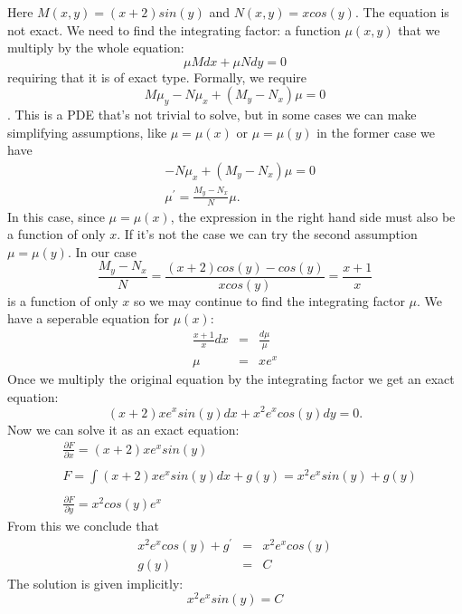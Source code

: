 \documentclass[11pt]{article}
\begin{document}
\begin{solution}
  Here $M(x, y) = \left( x + 2 \right) sin(y)$ and $N(x, y) = x cos(y)$. The equation
  is not exact. We need to find the integrating factor: a function $\mu(x, y)$ that
  we multiply by the whole equation:
  \[ \mu M dx + \mu N dy = 0 \]
  requiring that it is of exact type. Formally, we require
  \[ M \mu_y - N \mu_x + \left( M_y - N_x \right) \mu = 0 \].
  This is a PDE that's not trivial to solve, but in some cases we can make
  simplifying assumptions, like $\mu = \mu(x)$ or $\mu = \mu(y)$ in the former case
  we have
  \begin{eqnarray*}
    & -N \mu_x + \left( M_y - N_x \right) \mu = 0 \\
    & \mu^{\prime} = \frac {M_y - N_x} {N} \mu.
  \end{eqnarray*}
  In this case, since $\mu = \mu(x)$, the expression in the right hand side
  must also be a function of only $x$. If it's not the case we can try the second
  assumption $\mu = \mu(y)$.
  In our case
  \[ \frac {M_y - N_x} {N} = \frac {\left( x + 2 \right) cos(y) - cos(y)} {x cos(y)}
    = \frac {x+1} {x} \]
  is a function of only $x$ so we may continue to find the integrating factor $\mu$.
  We have a seperable equation for $\mu(x)$:
  \begin{eqnarray*}
    \frac {x+1} {x} dx & = & \frac {d \mu} {\mu} \\
    \mu & = & x e^x
  \end{eqnarray*}
  Once we multiply the original equation by the integrating factor we get an exact
  equation:
  \[ \left( x + 2 \right) x e^x sin(y) dx + x^2 e^x cos(y) dy = 0. \]
  Now we can solve it as an exact equation:
  \begin{eqnarray*}
    & \frac {\partial F} {\partial x} = \left( x + 2 \right) x e^x sin(y) \\\\
    & F = \int \left( x + 2 \right) x e^x sin(y) dx + g(y) = x^2 e^x sin(y) + g(y) \\\\
    & \frac {\partial F} {\partial y} = x^2 cos(y) e^x
  \end{eqnarray*}
  From this we conclude that
  \begin{eqnarray*}
    x^2 e^x cos(y) + g^{\prime} & = & x^2 e^x cos(y)\\
    g(y) & = & C
  \end{eqnarray*}
  The solution is given implicitly:
  \[ x^2 e^x sin(y) = C \]
  
  
\end{solution}
\end{document}
